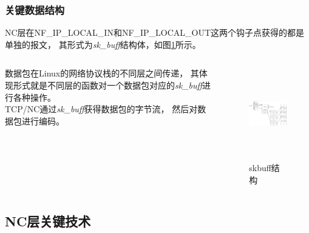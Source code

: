 \begin{frame}
	\frametitle{关键数据结构}
	NC层在NF\_IP\_LOCAL\_IN和NF\_IP\_LOCAL\_OUT这两个钩子点获得的都是单独的报文，
	其形式为\emph{sk\_buff}结构体，如图\ref{fig:skbuff}所示。
		\begin{columns}
		\begin{column}{0.5\textwidth}
			数据包在Linux的网络协议栈的不同层之间传递，
			其体现形式就是不同层的函数对一个数据包对应的\emph{sk\_buff}进行各种操作。
			\\
			TCP/NC通过\emph{sk\_buff}获得数据包的字节流，
			然后对数据包进行编码。
		\end{column}
		\begin{column}{0.4\textwidth}
			\vspace{-2em}
			\begin{figure}
				\includegraphics[height=4cm]{../figures/skbuff.eps}
				\caption{skbuff结构}
				\label{fig:skbuff}
			\end{figure}
		\end{column}
	\end{columns}
	
\end{frame}
\subsection{NC层关键技术}


